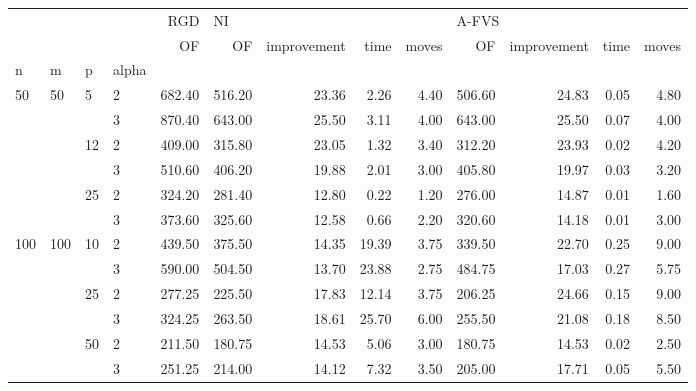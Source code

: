 \begin{tabular}{llllrrrrrrrrr}
\toprule
    &     &     &   &    RGD & \multicolumn{4}{l}{NI} & \multicolumn{4}{l}{A-FVS} \\
    &     &     &   &     OF &     OF & improvement &    time & moves &     OF & improvement & time & moves \\
n & m & p & alpha &        &        &             &         &       &        &             &      &       \\
\midrule
\multirow{6}{*}{50} & \multirow{6}{*}{50} & \multirow{2}{*}{5} & 2 & 682.40 & 516.20 &       23.36 &    2.26 &  4.40 & 506.60 &       24.83 & 0.05 &  4.80 \\
    &     &     & 3 & 870.40 & 643.00 &       25.50 &    3.11 &  4.00 & 643.00 &       25.50 & 0.07 &  4.00 \\
\cline{3-13}
    &     & \multirow{2}{*}{12} & 2 & 409.00 & 315.80 &       23.05 &    1.32 &  3.40 & 312.20 &       23.93 & 0.02 &  4.20 \\
    &     &     & 3 & 510.60 & 406.20 &       19.88 &    2.01 &  3.00 & 405.80 &       19.97 & 0.03 &  3.20 \\
\cline{3-13}
    &     & \multirow{2}{*}{25} & 2 & 324.20 & 281.40 &       12.80 &    0.22 &  1.20 & 276.00 &       14.87 & 0.01 &  1.60 \\
    &     &     & 3 & 373.60 & 325.60 &       12.58 &    0.66 &  2.20 & 320.60 &       14.18 & 0.01 &  3.00 \\
\cline{1-13}
\cline{2-13}
\cline{3-13}
\multirow{6}{*}{100} & \multirow{6}{*}{100} & \multirow{2}{*}{10} & 2 & 439.50 & 375.50 &       14.35 &   19.39 &  3.75 & 339.50 &       22.70 & 0.25 &  9.00 \\
    &     &     & 3 & 590.00 & 504.50 &       13.70 &   23.88 &  2.75 & 484.75 &       17.03 & 0.27 &  5.75 \\
\cline{3-13}
    &     & \multirow{2}{*}{25} & 2 & 277.25 & 225.50 &       17.83 &   12.14 &  3.75 & 206.25 &       24.66 & 0.15 &  9.00 \\
    &     &     & 3 & 324.25 & 263.50 &       18.61 &   25.70 &  6.00 & 255.50 &       21.08 & 0.18 &  8.50 \\
\cline{3-13}
    &     & \multirow{2}{*}{50} & 2 & 211.50 & 180.75 &       14.53 &    5.06 &  3.00 & 180.75 &       14.53 & 0.02 &  2.50 \\
    &     &     & 3 & 251.25 & 214.00 &       14.12 &    7.32 &  3.50 & 205.00 &       17.71 & 0.05 &  5.50 \\
\cline{1-13}
\cline{2-13}

\end{tabular}
